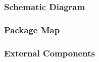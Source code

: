\documentclass{article}
\begin{document}
    \subsubsection{Schematic Diagram}

    \subsubsection{Package Map}




    \subsubsection{External Components}
\end{document}
